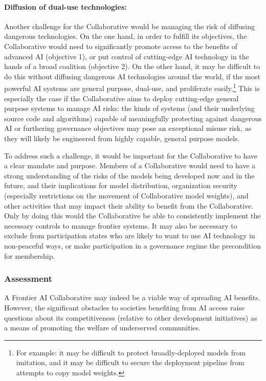 \documentclass[12pt]{article}
\begin{document}
\paragraph{Diffusion of dual-use technologies:} Another challenge for the
Collaborative would be managing the risk of diffusing dangerous
technologies. On the one hand, in order to fulfill its objectives, the
Collaborative would need to significantly promote access to the benefits
of advanced AI (objective 1), or put control of cutting-edge AI
technology in the hands of a broad coalition (objective 2). On the other
hand, it may be difficult to do this without diffusing dangerous AI
technologies around the world, if the most powerful AI systems are
general purpose, dual-use, and proliferate easily.\footnote{For example:
  it may be difficult to protect broadly-deployed models from imitation,
  and it may be difficult to secure the deployment pipeline from
  attempts to copy model weights.} This is especially the
case if the Collaborative aims to deploy cutting-edge general purpose
systems to manage AI risks: the kinds of systems (and their underlying
source code and algorithms) capable of meaningfully protecting against
dangerous AI or furthering governance objectives may pose an exceptional
misuse risk, as they will likely be engineered from highly capable,
general purpose models.

To address such a challenge, it would be important for the Collaborative
to have a clear mandate and purpose. Members of a Collaborative would
need to have a strong understanding of the risks of the models being
developed now and in the future, and their implications for model
distribution, organization security (especially restrictions on the
movement of Collaborative model weights), and other activities that may
impact their ability to benefit from the Collaborative. Only by doing
this would the Collaborative be able to consistently implement the
necessary controls to manage frontier systems. It may also be necessary
to exclude from participation states who are likely to want to use AI
technology in non-peaceful ways, or make participation in a governance
regime the precondition for membership.


\subsubsection*{Assessment}

A Frontier AI Collaborative may indeed be a viable way of spreading AI
benefits. However, the significant obstacles to societies benefiting
from AI access raise questions about its competitiveness (relative to
other development initiatives) as a means of promoting the welfare of
underserved communities.
\end{document}
